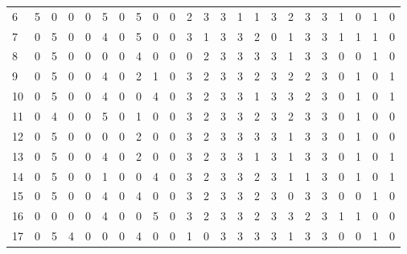 \begin{table}[htbp]
{\begin{tabular}{lllllllllllllllllllllll}
6                   & 5 & 0 & 0 & 0 & 5 & 0 & 5 & 0 & 0 & 2 & 3 & 3 & 1 & 1 & 3 & 2 & 3 & 3 & 1                  & 0                   & 1                   & 0                   \\
7                   & 0 & 5 & 0 & 0 & 4 & 0 & 5 & 0 & 0 & 3 & 1 & 3 & 3 & 2 & 0 & 1 & 3 & 3 & 1                  & 1                   & 1                   & 0                   \\
8                   & 0 & 5 & 0 & 0 & 0 & 0 & 4 & 0 & 0 & 0 & 2 & 3 & 3 & 3 & 3 & 1 & 3 & 3 & 0                  & 0                   & 1                   & 0                   \\
9                   & 0 & 5 & 0 & 0 & 4 & 0 & 2 & 1 & 0 & 3 & 2 & 3 & 3 & 2 & 3 & 2 & 2 & 3 & 0                  & 1                   & 0                   & 1                   \\
10                  & 0 & 5 & 0 & 0 & 4 & 0 & 0 & 4 & 0 & 3 & 2 & 3 & 3 & 1 & 3 & 3 & 2 & 3 & 0                  & 1                   & 0                   & 1                   \\
11                  & 0 & 4 & 0 & 0 & 5 & 0 & 1 & 0 & 0 & 3 & 2 & 3 & 3 & 2 & 3 & 2 & 3 & 3 & 0                  & 1                   & 0                   & 0                   \\
12                  & 0 & 5 & 0 & 0 & 0 & 0 & 2 & 0 & 0 & 3 & 2 & 3 & 3 & 3 & 3 & 1 & 3 & 3 & 0                  & 1                   & 0                   & 0                   \\
13                  & 0 & 5 & 0 & 0 & 4 & 0 & 2 & 0 & 0 & 3 & 2 & 3 & 3 & 1 & 3 & 1 & 3 & 3 & 0                  & 1                   & 0                   & 1                   \\
14                  & 0 & 5 & 0 & 0 & 1 & 0 & 0 & 4 & 0 & 3 & 2 & 3 & 3 & 2 & 3 & 1 & 1 & 3 & 0                  & 1                   & 0                   & 1                   \\
15                  & 0 & 5 & 0 & 0 & 4 & 0 & 4 & 0 & 0 & 3 & 2 & 3 & 3 & 2 & 3 & 0 & 3 & 3 & 0                  & 0                   & 1                   & 0                   \\
16                  & 0 & 0 & 0 & 0 & 4 & 0 & 0 & 5 & 0 & 3 & 2 & 3 & 3 & 2 & 3 & 3 & 2 & 3 & 1                  & 1                   & 0                   & 0                   \\
17                  & 0 & 5 & 4 & 0 & 0 & 0 & 4 & 0 & 0 & 1 & 0 & 3 & 3 & 3 & 3 & 1 & 3 & 3 & 0                  & 0                   & 1                   & 0                   \\

\end{tabular}}
\end{table}

